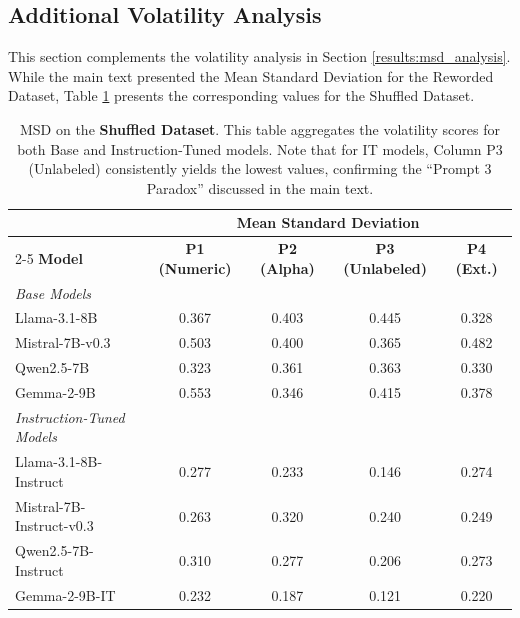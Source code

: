 \subsection{Additional Volatility Analysis}
\label{app:msd_analysis_complementary}
This section complements the volatility analysis in Section \ref{results:msd_analysis}. While the main text presented the Mean Standard Deviation for the Reworded Dataset, Table \ref{tab:mean_volatility_shuff} presents the corresponding values for the Shuffled Dataset.

\begin{table}[H]
    \centering
    \small
    \caption{MSD on the \textbf{Shuffled Dataset}. This table aggregates the volatility scores for both Base and Instruction-Tuned models. Note that for IT models, Column P3 (Unlabeled) consistently yields the lowest values, confirming the ``Prompt 3 Paradox'' discussed in the main text.}
    \label{tab:mean_volatility_shuff}
    \begin{tabular}{lcccc}
        \toprule
        & \multicolumn{4}{c}{\textbf{Mean Standard Deviation}} \\
        \cmidrule(lr){2-5}
        \textbf{Model} & \textbf{P1 (Numeric)} & \textbf{P2 (Alpha)} & \textbf{P3 (Unlabeled)} & \textbf{P4 (Ext.)} \\
        \midrule
        \textit{Base Models} & & & & \\
        Llama-3.1-8B & 0.367 & 0.403 & 0.445 & 0.328 \\
        Mistral-7B-v0.3 & 0.503 & 0.400 & 0.365 & 0.482 \\
        Qwen2.5-7B & 0.323 & 0.361 & 0.363 & 0.330 \\
        Gemma-2-9B & 0.553 & 0.346 & 0.415 & 0.378 \\
        \midrule
        \textit{Instruction-Tuned Models} & & & & \\
        Llama-3.1-8B-Instruct & 0.277 & 0.233 & 0.146 & 0.274 \\
        Mistral-7B-Instruct-v0.3 & 0.263 & 0.320 & 0.240 & 0.249 \\
        Qwen2.5-7B-Instruct & 0.310 & 0.277 & 0.206 & 0.273 \\
        Gemma-2-9B-IT & 0.232 & 0.187 & 0.121 & 0.220 \\
        \bottomrule
    \end{tabular}
\end{table}

